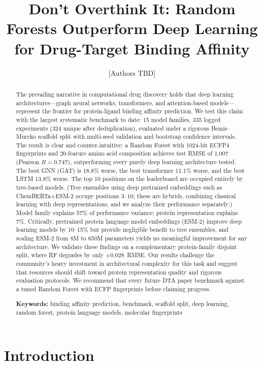 \documentclass[11pt,twocolumn,a4paper]{article}
\title{Don't Overthink It: Random Forests Outperform Deep Learning for Drug-Target Binding Affinity}
\author{[Authors TBD]}
\date{}
\begin{document}
\maketitle

\begin{abstract}
The prevailing narrative in computational drug discovery holds that deep learning architectures---graph neural networks, transformers, and attention-based models---represent the frontier for protein-ligand binding affinity prediction. We test this claim with the largest systematic benchmark to date: 15 model families, 335 logged experiments (324 unique after deduplication), evaluated under a rigorous Bemis--Murcko scaffold split with multi-seed validation and bootstrap confidence intervals. The result is clear and counter-intuitive: a Random Forest with 1024-bit ECFP4 fingerprints and 20-feature amino acid composition achieves test RMSE of 1.007 (Pearson $R = 0.747$), outperforming every purely deep learning architecture tested. The best GNN (GAT) is 18.8\% worse, the best transformer 11.1\% worse, and the best LSTM 13.8\% worse. The top 10 positions on the leaderboard are occupied entirely by tree-based models. (Tree ensembles using deep pretrained embeddings such as ChemBERTa+ESM-2 occupy positions 3--10; these are hybrids, combining classical learning with deep representations, and we analyze their performance separately.) Model family explains 57\% of performance variance; protein representation explains 7\%. Critically, pretrained protein language model embeddings (ESM-2) improve deep learning models by 10--15\% but provide negligible benefit to tree ensembles, and scaling ESM-2 from 8M to 650M parameters yields no meaningful improvement for any architecture. We validate these findings on a complementary protein-family disjoint split, where RF degrades by only $+$0.028~RMSE. Our results challenge the community's heavy investment in architectural complexity for this task and suggest that resources should shift toward protein representation quality and rigorous evaluation protocols. We recommend that every future DTA paper benchmark against a tuned Random Forest with ECFP fingerprints before claiming progress.

\vspace{1em}
\noindent\textbf{Keywords:} binding affinity prediction, benchmark, scaffold split, deep learning, random forest, protein language models, molecular fingerprints
\end{abstract}

\section{Introduction}
\end{document}
